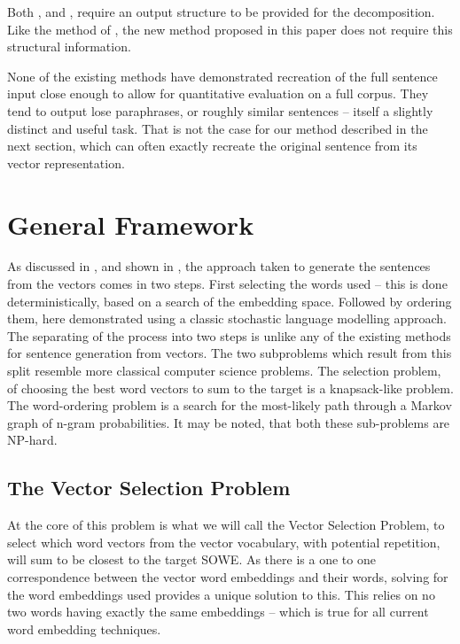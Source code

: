 \documentclass[11pt]{article}
\theoremstyle{plain}
\theoremstyle{definition}
\begin{document}
Both \textcite{Dinu2014CompositionalGeneration}, and  \textcite{iyyer2014generating}, require an output structure to be provided for the decomposition. Like the method of  \textcite{Bowman2015SmoothGeneration}, the new method proposed in this paper does not require this structural information.

None of the existing methods have demonstrated recreation of the full sentence input close enough to allow for quantitative evaluation on a full corpus. They tend to output lose paraphrases, or roughly similar sentences -- itself a slightly distinct and useful task.  That is not the case for our method described in the next section, which can often exactly recreate the original sentence from its vector representation.

\section{General Framework}\label{framework}
As discussed in , and shown in , the approach taken to generate the sentences from the vectors comes in two steps. First selecting the words used -- this is done deterministically, based on a search of the embedding space. Followed by ordering them, here demonstrated using a classic stochastic language modelling approach. The separating of the process into two steps is unlike any of the existing methods for sentence generation from vectors. The two subproblems which result from this split resemble more classical computer science problems. The selection problem, of choosing the best word vectors to sum to the target is a knapsack-like problem. The word-ordering problem is a search for the most-likely path through a Markov graph of n-gram probabilities. It may be noted, that both these sub-problems are NP-hard.

\subsection{The Vector Selection Problem}

At the core of this problem is what we will call the Vector Selection Problem, to select which word vectors from the vector vocabulary, with potential repetition, will sum to be closest to the target SOWE.
As there is a one to one correspondence between the vector word embeddings and their words, solving for the word embeddings used provides a unique solution to this. This relies on no two words having exactly the same embeddings -- which is true for all current word embedding techniques.
\end{document}
